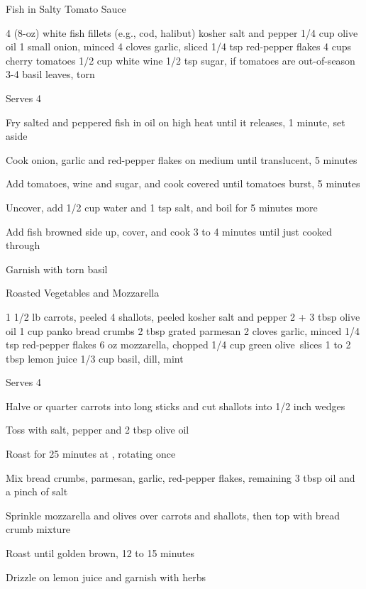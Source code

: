 \begin{denserecipe}{Fish in Salty Tomato Sauce}{}
\begin{ingredients}
4 (8-oz) white fish fillets (e.g., cod, halibut)
kosher salt and pepper
1/4 cup olive oil
1 small onion, minced
4 cloves garlic, sliced
1/4 tsp red-pepper flakes
4 cups cherry tomatoes
1/2 cup white wine
1/2 tsp sugar, if tomatoes are out-of-season
3-4 basil leaves, torn
\end{ingredients}
\nextcolumn
Serves 4
\begin{steps}
\item Fry salted and peppered fish in oil on high heat until it releases, 1 minute, set aside
\item Cook onion, garlic and red-pepper flakes on medium until translucent, 5 minutes
\item Add tomatoes, wine and sugar, and cook covered until tomatoes burst, 5 minutes
\item Uncover, add 1/2 cup water and 1 tsp salt, and boil for 5 minutes more
\item Add fish browned side up, cover, and cook 3 to 4 minutes until just cooked through
\item Garnish with torn basil
\end{steps}
\end{denserecipe}

\begin{denserecipe}{Roasted Vegetables and Mozzarella}{\vegetarian{}}
\begin{ingredients}
1 1/2 lb carrots, peeled
4 shallots, peeled
kosher salt and pepper
2 + 3 tbsp olive oil
1 cup panko bread crumbs
2 tbsp grated parmesan
2 cloves garlic, minced
1/4 tsp red-pepper flakes
6 oz mozzarella, chopped
1/4 cup green \mbox{olive slices}
1 to 2 tbsp lemon juice
1/3 cup basil, dill, mint
\end{ingredients}
\nextcolumn
Serves 4
\begin{steps}
\item Halve or quarter carrots into long sticks and cut shallots into 1/2 inch wedges
\item Toss with salt, pepper and 2 tbsp olive oil
\item Roast for 25 minutes at , rotating once
\item Mix bread crumbs, parmesan, garlic, red-pepper flakes, remaining 3 tbsp oil and a pinch of salt
\item Sprinkle mozzarella and olives over carrots and shallots, then top with bread crumb mixture
\item Roast until golden brown, 12 to 15 minutes
\item Drizzle on lemon juice and garnish with herbs
\end{steps}
\end{denserecipe}

